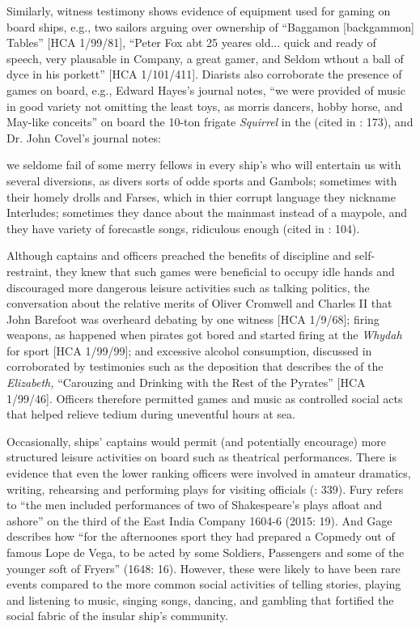Similarly, witness testimony shows evidence of equipment used for gaming on board ships, e.g., two sailors arguing over ownership of “Baggamon [backgammon] Tables” [HCA 1/99/81], “Peter Fox abt 25 yeares old... quick and ready of speech, very plausable in Company, a great gamer, and Seldom wthout a ball of dyce in his porkett” [HCA 1/101/411]. Diarists also corroborate the presence of games on board, e.g., Edward Hayes’s  journal notes, “we were provided of music in good variety not omitting the least toys, as morris dancers, hobby horse, and May-like conceits” on board the 10-ton frigate \textit{Squirrel} in the  (cited in \citealt{Bicheno2012}: 173), and Dr. John Covel’s  journal notes:

we seldome fail of some merry fellows in every ship’s  who will entertain us with several diversions, as divers sorts of odde sports and Gambols; sometimes with their homely drolls and Farses, which in thier corrupt language they nickname Interludes; sometimes they dance about the mainmast instead of a maypole, and they have variety of forecastle songs, ridiculous enough (cited in \citealt{Palmer1986}: 104).

Although captains and officers preached the benefits of discipline and self-restraint, they knew that such games were beneficial to occupy idle hands and discouraged more dangerous leisure activities such as talking politics, the conversation about the relative merits of Oliver Cromwell and Charles II that John Barefoot was overheard debating by one witness [HCA 1/9/68]; firing weapons, as happened when pirates got bored and started firing at the \textit{Whydah} for sport [HCA 1/99/99]; and excessive alcohol consumption, discussed in  corroborated by testimonies such as the deposition that describes the  of the \textit{Elizabeth,} “Carouzing and Drinking with the Rest of the Pyrates” [HCA 1/99/46]. Officers therefore permitted games and music as controlled social acts that helped relieve tedium during uneventful hours at sea. 

Occasionally, ships’ captains would permit (and potentially encourage) more structured leisure activities on board such as theatrical performances. There is evidence that even the lower ranking officers were involved in amateur dramatics, writing, rehearsing and performing plays for visiting officials (\citealt{AdkinsAdkins2008}: 339). Fury refers to “the men included performances of two of Shakespeare’s plays afloat and ashore” on the third  of the East India Company {1604}-6 (2015: 19). And Gage describes how “for the afternoones sport they had prepared a Copmedy out of famous Lope de Vega, to be acted by some Soldiers, Passengers and some of the younger soft of Fryers” (1648: 16). However, these were likely to have been rare events compared to the more common social activities of telling stories, playing and listening to music, singing songs, dancing, and gambling that fortified the social fabric of the insular ship’s community. 

